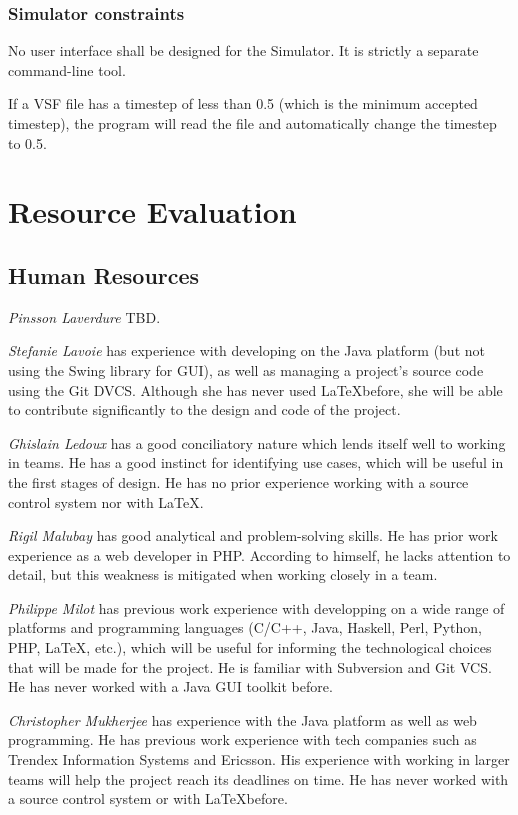 \documentclass{article}
\begin{document}
\subsubsection{Simulator constraints}

No user interface shall be designed for the Simulator. It is strictly a separate command-line tool.

If a VSF file has a timestep of less than 0.5 (which is the minimum accepted timestep), the program will read the file and automatically change the timestep to 0.5.

\section{Resource Evaluation} %

\subsection{Human Resources} %

\emph{Pinsson Laverdure} TBD.

\emph{Stefanie Lavoie} has experience with developing on the Java platform (but not using the Swing library for GUI), as well as managing a project's source code using the Git DVCS. Although she has never used \LaTeX before, she will be able to contribute significantly to the design and code of the project.

\emph{Ghislain Ledoux} has a good conciliatory nature which lends itself well to working in teams. He has a good instinct for identifying use cases, which will be useful in the first stages of design. He has no prior experience working with a source control system nor with \LaTeX.

\emph{Rigil Malubay} has good analytical and problem-solving skills. He has prior work experience as a web developer in PHP. According to himself, he lacks attention to detail, but this weakness is mitigated when working closely in a team.

\emph{Philippe Milot} has previous work experience with developping on a wide range of platforms and programming languages (C/C++, Java, Haskell, Perl, Python, PHP, \LaTeX, etc.), which will be useful for informing the technological choices that will be made for the project. He is familiar with Subversion and Git VCS. He has never worked with a Java GUI toolkit before.

\emph{Christopher Mukherjee} has experience with the Java platform as well as web programming. He has previous work experience with tech companies such as Trendex Information Systems and Ericsson. His experience with working in larger teams will help the project reach its deadlines on time. He has never worked with a source control system or with \LaTeX before.
\end{document}
